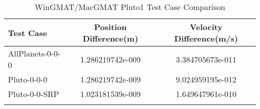 \begin{table}[htbp!]
\centering
\caption{ WinGMAT/MacGMAT Pluto1 Test Case Comparison}
      \begin{tabular}{lcc}
      \hline\hline
          Test Case & Position Difference(m) & Velocity Difference(m/s) \\
         \hline
         AllPlanets-0-0-0 & 1.286219742e-009 & 3.384705673e-011 \\
         Pluto-0-0-0 & 1.286219742e-009 & 9.024959195e-012 \\
         Pluto-0-0-SRP & 1.023181539e-009 & 1.649647961e-010 \\
      \hline\hline
      \label{Table: Pluto1 WinGMAT-MacGMAT Table} 
\end{tabular}
\end{table}
